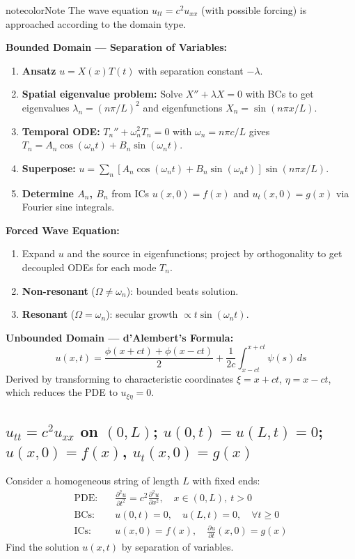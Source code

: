 \documentclass[a4paper,11pt]{article} %
\newenvironment{notebox}[1][]{\begin{custombox}[#1]{notecolor}{Note}}{\end{custombox}}
\begin{document}
\begin{notebox}[title={General Procedure: Solving the Wave Equation}]
The wave equation $u_{tt}=c^2 u_{xx}$ (with possible forcing) is approached according to the domain type.

\textbf{Bounded Domain --- Separation of Variables:}
\begin{enumerate}
    \item \textbf{Ansatz} $u = X(x)T(t)$ with separation constant $-\lambda$.
    \item \textbf{Spatial eigenvalue problem:} Solve $X''+\lambda X = 0$ with BCs to get eigenvalues $\lambda_n = (n\pi/L)^2$ and eigenfunctions $X_n = \sin(n\pi x/L)$.
    \item \textbf{Temporal ODE:} $T_n'' + \omega_n^2 T_n = 0$ with $\omega_n = n\pi c/L$ gives $T_n = A_n\cos(\omega_n t)+B_n\sin(\omega_n t)$.
    \item \textbf{Superpose:} $u = \sum_n [A_n\cos(\omega_n t)+B_n\sin(\omega_n t)]\sin(n\pi x/L)$.
    \item \textbf{Determine $A_n$, $B_n$} from ICs $u(x,0)=f(x)$ and $u_t(x,0)=g(x)$ via Fourier sine integrals.
\end{enumerate}
\textbf{Forced Wave Equation:}
\begin{enumerate}
    \item Expand $u$ and the source in eigenfunctions; project by orthogonality to get decoupled ODEs for each mode $T_n$.
    \item \textbf{Non-resonant} ($\Omega\ne\omega_n$): bounded beats solution.
    \item \textbf{Resonant} ($\Omega=\omega_n$): secular growth $\propto t\sin(\omega_n t)$.
\end{enumerate}
\textbf{Unbounded Domain --- d'Alembert's Formula:}
$$u(x,t) = \frac{\phi(x+ct)+\phi(x-ct)}{2}+\frac{1}{2c}\int_{x-ct}^{x+ct}\psi(s)\,ds$$
Derived by transforming to characteristic coordinates $\xi=x+ct$, $\eta=x-ct$, which reduces the PDE to $u_{\xi\eta}=0$.
\end{notebox}

\subsection{\texorpdfstring{ $u_{tt}=c^2 u_{xx}$ on $(0,L)$; $u(0,t)=u(L,t)=0$; $u(x,0)=f(x)$, $u_t(x,0)=g(x)$}{Reference: 1D wave equation IBVP via separation of variables; Fourier sine series}}

\begin{problembox}
Consider a homogeneous string of length $L$ with fixed ends:
\begin{align*}
    \text{PDE:} & \quad \frac{\partial^2 u}{\partial t^2} = c^2 \frac{\partial^2 u}{\partial x^2}, \quad x \in (0, L), \ t > 0 \\
    \text{BCs:} & \quad u(0,t) = 0, \quad u(L,t) = 0, \quad \forall t \geq 0 \\
    \text{ICs:} & \quad u(x,0) = f(x), \quad \frac{\partial u}{\partial t}(x,0) = g(x)
\end{align*}
Find the solution $u(x,t)$ by separation of variables.
\end{problembox}
\end{document}
